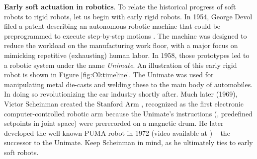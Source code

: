 \textbf{Early soft actuation in robotics}. To relate the historical progress of soft robots to rigid robots, let us begin with early rigid robots. In 1954, George Devol filed a patent describing an autonomous robotic machine that could be preprogrammed to execute step-by-step motions \cite{Mickle2008}. The machine was designed to reduce the workload on the manufacturing work floor, with a major focus on mimicking repetitive (exhausting) human labor. In 1958, those prototypes led to a robotic system under the name \emph{Unimate}. An illustration of this early rigid robot is shown in Figure \ref{fig:C0:timeline}. The Unimate was used for manipulating metal die-casts and welding these to the main body of automobiles. In doing so revolutionizing the car industry shortly after. Much later (1969), Victor Scheinman created the Stanford Arm \cite{BibEntryStanford2022Sep,BibEntryOrm2019Sep}, recognized as the first electronic computer-controlled robotic arm because the Unimate's instructions (\ie, predefined setpoints in joint space) were prerecorded on a magnetic drum. He later developed the well-known PUMA robot in 1972 (video available at \cite{BibEntryPuma2022Sep}) -- the successor to the Unimate. Keep Scheinman in mind, as he ultimately ties to early soft robots. \vspace{0.085em}


